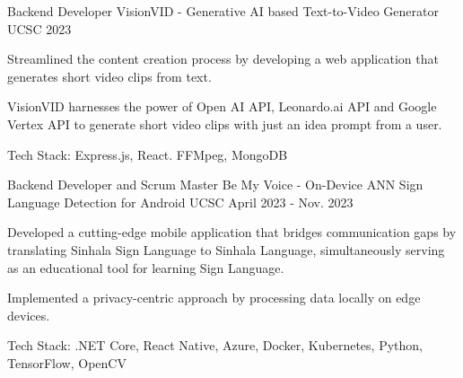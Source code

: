 

\begin{cventries}


    \cventry
    {Backend Developer} %
    {VisionVID - Generative AI based Text-to-Video Generator \href{https://visionvid.vercel.app/}{\faGithubSquare}} %
    {UCSC} %
    {2023} %
    {
        \begin{cvitems} %
            \item {Streamlined the content creation process by developing a web application that generates short video clips from text.}
            \item {VisionVID harnesses the power of Open AI API, Leonardo.ai API and Google Vertex API to generate short video clips with just an idea prompt from a user.}
            \item {Tech Stack: Express.js, React. FFMpeg, MongoDB}
        \end{cvitems}
    }

    \cventry
    {Backend Developer and Scrum Master} %
    {Be My Voice - On-Device ANN Sign Language Detection for Android \href{https://github.com/kulasinghet/backend-be-voice}{\faGithubSquare}} %
    {UCSC} %
    {April 2023 - Nov. 2023} %
    {
        \begin{cvitems} %
            \item {Developed a cutting-edge mobile application that bridges communication gaps by translating Sinhala Sign Language to Sinhala Language, simultaneously serving as an educational tool for learning Sign Language.}
            \item {Implemented a privacy-centric approach by processing data locally on edge devices.}
            \item {Tech Stack: .NET Core, React Native, Azure, Docker, Kubernetes, Python, TensorFlow, OpenCV}
        \end{cvitems}
    }




\end{cventries}

